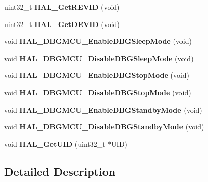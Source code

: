 \begin{DoxyCompactItemize}
uint32\+\_\+t {\bfseries H\+A\+L\+\_\+\+Get\+R\+E\+V\+ID} (void)
\item 
\mbox{\label{group___h_a_l___exported___functions___group2_gaff785f069ed650de77ff82ac407f7c84}} 
uint32\+\_\+t {\bfseries H\+A\+L\+\_\+\+Get\+D\+E\+V\+ID} (void)
\item 
\mbox{\label{group___h_a_l___exported___functions___group2_gaf031bcc71ebad9b7edf405547efd762b}} 
void {\bfseries H\+A\+L\+\_\+\+D\+B\+G\+M\+C\+U\+\_\+\+Enable\+D\+B\+G\+Sleep\+Mode} (void)
\item 
\mbox{\label{group___h_a_l___exported___functions___group2_gac7820d0561f19999a68d714655b901b5}} 
void {\bfseries H\+A\+L\+\_\+\+D\+B\+G\+M\+C\+U\+\_\+\+Disable\+D\+B\+G\+Sleep\+Mode} (void)
\item 
\mbox{\label{group___h_a_l___exported___functions___group2_gadf25043b17de4bef38a95a75fd03e5c4}} 
void {\bfseries H\+A\+L\+\_\+\+D\+B\+G\+M\+C\+U\+\_\+\+Enable\+D\+B\+G\+Stop\+Mode} (void)
\item 
\mbox{\label{group___h_a_l___exported___functions___group2_ga2c93dcee35e5983d74f1000de7c042d5}} 
void {\bfseries H\+A\+L\+\_\+\+D\+B\+G\+M\+C\+U\+\_\+\+Disable\+D\+B\+G\+Stop\+Mode} (void)
\item 
\mbox{\label{group___h_a_l___exported___functions___group2_ga28a1323b2eeb0a408c1cfdbfa0db5ead}} 
void {\bfseries H\+A\+L\+\_\+\+D\+B\+G\+M\+C\+U\+\_\+\+Enable\+D\+B\+G\+Standby\+Mode} (void)
\item 
\mbox{\label{group___h_a_l___exported___functions___group2_ga7faa58d8508ea3123b9f247a70379779}} 
void {\bfseries H\+A\+L\+\_\+\+D\+B\+G\+M\+C\+U\+\_\+\+Disable\+D\+B\+G\+Standby\+Mode} (void)
\item 
\mbox{\label{group___h_a_l___exported___functions___group2_ga6b943c94114771a9c29f36042196676e}} 
void {\bfseries H\+A\+L\+\_\+\+Get\+U\+ID} (uint32\+\_\+t $\ast$U\+ID)
\end{DoxyCompactItemize}


\subsection{Detailed Description}
